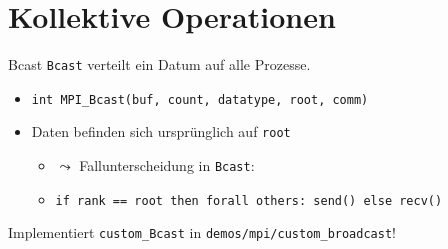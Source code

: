\documentclass{beamer}
\begin{document}
\section{Kollektive Operationen}

\begin{frame}{Bcast}
	\texttt{Bcast} verteilt ein Datum auf alle Prozesse.

	\begin{figure}
	\end{figure}

	\begin{itemize}
		\item {\footnotesize \texttt{int MPI\_Bcast(buf, count, datatype, root, comm)}}
		\item Daten befinden sich ursprünglich auf \texttt{root} 
		\begin{itemize}
			\item $\leadsto$ Fallunterscheidung in \texttt{Bcast}:
			\item {\footnotesize \texttt{if rank == root then forall others: send() else recv()}}
		\end{itemize}
	\end{itemize}

	\pause
	Implementiert \texttt{custom\_Bcast} in \texttt{demos/mpi/custom\_broadcast}!
\end{frame}
\end{document}
